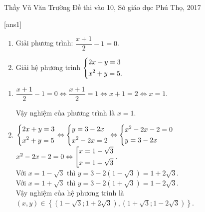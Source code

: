 \begin{name}
{Thầy  Vũ Văn Trường}
{Đề thi vào 10, Sở giáo dục Phú Thọ, 2017}
\end{name}
\setcounter{ex}{0}
[ans1]
\begin{ex}%
\hfill
\begin{enumerate}
\item
Giải phương trình: $\dfrac{x+1}{2}-1=0$.
\item
Giải hệ phương trình
$\left\{\begin{aligned}&2x+y=3\\&x^2+y=5.\end{aligned}\right.$
\end{enumerate}
\loigiai
{
\begin{enumerate}
\item $\dfrac{x+1}{2}-1=0\Leftrightarrow \dfrac{x+1}{2}=1\Leftrightarrow x+1=2 \Leftrightarrow x=1$.

Vậy nghiệm của phương trình là $x=1$.
\item $\left\{\begin{aligned}&2x+y=3\\&x^2+y=5\end{aligned}\right.\Leftrightarrow \left\{\begin{aligned}&y=3-2x\\
&x^2-2x=2\end{aligned}\right.\Leftrightarrow\left\{\begin{aligned}&x^2-2x-2=0\\
&y=3-2x\end{aligned}\right.$\\
$x^2-2x-2=0 \Leftrightarrow \left[\begin{aligned}&x=1-\sqrt{3}\\&x=1+\sqrt{3}\end{aligned}\right..$\\
Với $x=1-\sqrt{3}$ thì $y=3-2(1-\sqrt{3})=1+2\sqrt{3}.$\\
Với $x=1+\sqrt{3}$ thì $y=3-2(1+\sqrt{3})=1-2\sqrt{3}.$\\
Vậy nghiệm của hệ phương trình là $(x,y)\in\left\{(1-\sqrt{3}; 1+2\sqrt{3}), (1+\sqrt{3}; 1-2\sqrt{3})\right\}$.


\end{enumerate}
}
\end{ex}


